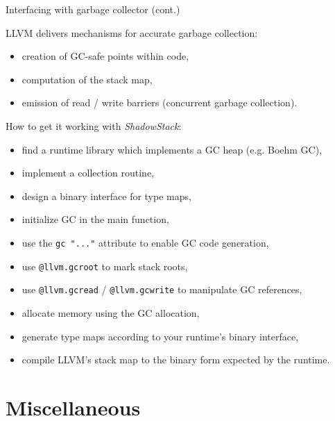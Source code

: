 \documentclass[8pt]{beamer}
\begin{document}
\begin{frame}[fragile]{Interfacing with garbage collector (cont.)}
  \begin{block}{LLVM delivers mechanisms for accurate garbage collection:}
    \begin{itemize}
      \item creation of GC-safe points within code,
      \item computation of the stack map,
      \item emission of read / write barriers (concurrent garbage collection).
    \end{itemize}
  \end{block}

  \begin{block}{How to get it working with \textit{ShadowStack}:}
    \begin{itemize}
      \item find a runtime library which implements a GC heap (e.g. Boehm GC),
      \item implement a collection routine,
      \item design a binary interface for type maps,
      \item initialize GC in the main function,
      \item use the \verb+gc "..."+ attribute to enable GC code generation,
      \item use \verb+@llvm.gcroot+ to mark stack roots,
      \item use \verb+@llvm.gcread+ / \verb+@llvm.gcwrite+ to manipulate GC
        references,
      \item allocate memory using the GC allocation,
      \item generate type maps according to your runtime's binary interface,
      \item compile LLVM's stack map to the binary form expected by the
        runtime.
    \end{itemize}
  \end{block}
\end{frame}

\section[Miscellaneous]{Miscellaneous}
\subsection*{}
\end{document}
